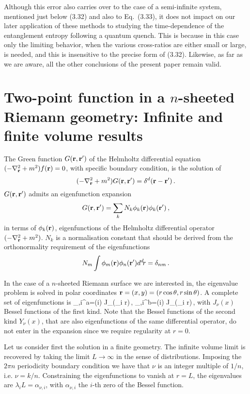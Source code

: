 \documentclass[12pt,aps]{revtex4}
\begin{document}
Although this error also carries over to the case of a
semi-infinite system, mentioned just below (3.32) and also to
Eq.~(3.33), it does not impact on our later application of these
methods to studying the time-dependence of the entanglement
entropy following a quantum quench\cite{cc3}. This is because in
this case only the limiting behavior, when the various
cross-ratios are either small or large, is needed, and this is
insensitive to the precise form of (3.32). Likewise, as far as we
are aware, all the other conclusions of the present paper remain
valid.




\appendix

\section{Two-point function in a $n$-sheeted Riemann geometry:
Infinite and finite volume results}

The Green function $G({\bf r,r'})$ of the Helmholtz differential equation
$(-\nabla^2_{\bf r}+m^2)f({\bf r})=0$, with specific boundary condition,
is the solution of
$$
(-\nabla^2_{\bf r}+m^2)G({\bf r,r'})=\delta^d({\bf r-r'})\,.
$$
$G({\bf r,r'})$ admits an eigenfunction expansion
$$
G({\bf r,r'})=\sum_k N_k \phi_k({\bf r}) \phi_k({\bf r'})\,,
$$
in terms of $\phi_k({\bf r})$, eigenfunctions of the Helmholtz differential
operator $(-\nabla^2_{\bf r}+m^2)$.
$N_k$ is a  normalisation constant that should be derived from the
orthonormality requirement of the eigenfunctions
$$
N_m\int \phi_m({\bf r})\phi_n({\bf r'})d^d\!r=\delta_{nm}\,.
$$

In the case of a $n$-sheeted Riemann surface we are interested in,
the eigenvalue problem is solved in polar coordinates
${\bf r}=(x,y)=(r\cos\theta,r\sin\theta)$.
A complete set of eigenfunctions is
\be
\phi_{\nu,i}^a=\cos({i\nu \theta}) J_\nu(\lambda_i r)\,,\qquad
\phi_{\nu,i}^b=\sin({i\nu \theta}) J_\nu(\lambda_i r)\,,
\ee
with $J_\nu(x)$ Bessel functions of the first kind.
Note that the Bessel functions of the second kind $Y_\nu(x)$, that are also
eigenfunctions of the same differential operator, do not enter in
the expansion since we require regularity at $r=0$.

Let us consider first the solution in a finite geometry.
The infinite volume limit is recovered by taking the limit
$L\rightarrow \infty$ in the sense of distributions.
Imposing the $2\pi n$ periodicity boundary condition we have that $\nu$ is
an integer multiple of $1/n$, i.e. $\nu=k/n$.
Constraining the eigenfunctions to vanish at $r=L$, the eigenvalues
are $\lambda_i L=\alpha_{\nu,i}$, with $\alpha_{\nu,i}$ the $i$-th zero of
the Bessel function.
\end{document}
